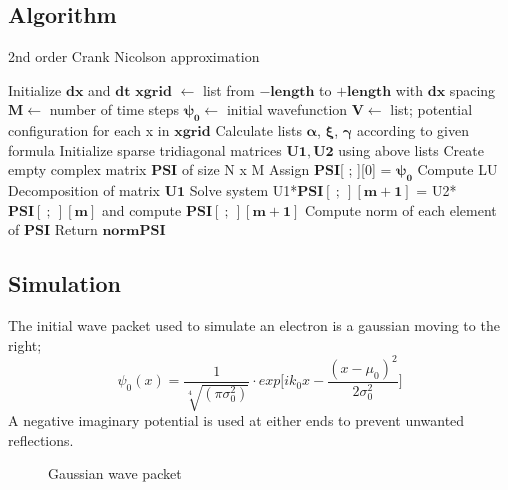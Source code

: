 \documentclass{article}
\begin{document}
\subsection{Algorithm}
\begin{algorithm}
\caption{2nd order Crank Nicolson approximation}
\begin{algorithmic}[1]

    \State Initialize $\mathbf{dx}$ and $\mathbf{dt}$ 
    \State $\mathbf{xgrid}$ $\leftarrow$ list from $\mathbf{-length}$ to $\mathbf{+length}$ with $\mathbf{dx}$ spacing
    \State $\mathbf{M} \leftarrow$ number of time steps
    \State $\pmb{\psi_0} \leftarrow$ initial wavefunction  
    \State $\mathbf{V} \leftarrow$ list; potential configuration for each x in $\mathbf{xgrid}$
    \State
    \State Calculate lists $\pmb{\alpha}$, $\pmb{\xi}$, $\pmb{\gamma}$ according to given formula
    \State Initialize sparse tridiagonal matrices $\mathbf{U1, U2}$ using above lists
    \State Create empty complex matrix $\mathbf{PSI}$ of size N x M 
    \State Assign $\mathbf{PSI}$[ ; ][0] = $\pmb{\psi_0}$
    \State Compute LU Decomposition of matrix $\mathbf{U1}$
    \State
        \State Solve system U1*$\mathbf{PSI[\ ;\ ][m+1]}$ = U2*$\mathbf{PSI[\ ;\ ][m]}$ and compute $\mathbf{PSI[\ ;\ ][m+1]}$ 
        \State
        \State {}  
        \State 
    \EndFor
    \State Compute norm of each element of $\mathbf{PSI}$
    \State Return $\mathbf{normPSI}$
    \EndProcedure

\end{algorithmic}
\end{algorithm}
\subsection{Simulation}
The initial wave packet used to simulate an electron is a gaussian moving to the right;
$$\psi_0(x)=\frac{1}{\sqrt[4]{(\pi\sigma_0^2)}} \cdot exp\bigg[ ik_0 x - \frac{(x-\mu_0)^2}{2\sigma_0^2} \bigg]$$
A negative imaginary potential is used at either ends to prevent unwanted reflections.\cite{absorbV}

\begin{figure}[h!]
\caption{Gaussian wave packet}
\end{figure}
\end{document}
